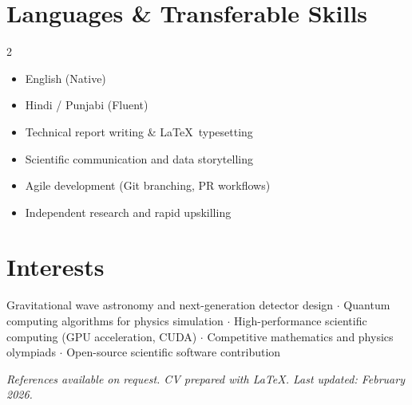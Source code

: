 \documentclass[10pt, a4paper]{article}
\begin{document}
\section{Languages \& Transferable Skills}

\begin{multicols}{2}
\begin{itemize}
  \item English (Native)
  \item Hindi / Punjabi (Fluent)
  \item Technical report writing \& \LaTeX\ typesetting
  \item Scientific communication and data storytelling
  \item Agile development (Git branching, PR workflows)
  \item Independent research and rapid upskilling
\end{itemize}
\end{multicols}

\section{Interests}

Gravitational wave astronomy and next-generation detector design $\cdot$
Quantum computing algorithms for physics simulation $\cdot$
High-performance scientific computing (GPU acceleration, CUDA) $\cdot$
Competitive mathematics and physics olympiads $\cdot$
Open-source scientific software contribution

\vfill
{\small\color{light}\textit{References available on request. CV prepared with \LaTeX. Last updated: February 2026.}}
\end{document}
